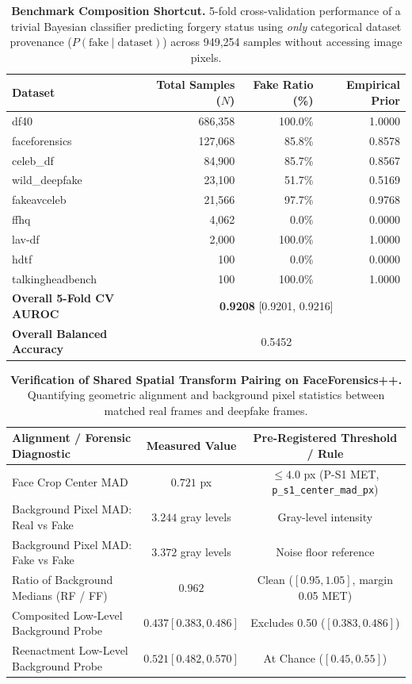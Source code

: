 \begin{table}[t]
\centering
\small
\caption{\textbf{Benchmark Composition Shortcut.} 5-fold cross-validation performance of a trivial Bayesian classifier predicting forgery status using \emph{only} categorical dataset provenance ($P(\text{fake} \mid \text{dataset})$) across 949,254 samples without accessing image pixels.}
\label{tab:dataset_id}
\begin{tabular}{lrrr}
\toprule
\textbf{Dataset} & \textbf{Total Samples ($N$)} & \textbf{Fake Ratio (\%)} & \textbf{Empirical Prior} \\
\midrule
df40 & 686,358 & 100.0\% & 1.0000 \\
faceforensics & 127,068 & 85.8\% & 0.8578 \\
celeb_df & 84,900 & 85.7\% & 0.8567 \\
wild_deepfake & 23,100 & 51.7\% & 0.5169 \\
fakeavceleb & 21,566 & 97.7\% & 0.9768 \\
ffhq & 4,062 & 0.0\% & 0.0000 \\
lav-df & 2,000 & 100.0\% & 1.0000 \\
hdtf & 100 & 0.0\% & 0.0000 \\
talkingheadbench & 100 & 100.0\% & 1.0000 \\
\midrule
\textbf{Overall 5-Fold CV AUROC} & \multicolumn{3}{c}{\textbf{0.9208} [0.9201, 0.9216]} \\
\textbf{Overall Balanced Accuracy} & \multicolumn{3}{c}{0.5452} \\
\bottomrule
\end{tabular}
\end{table}


\begin{table}[t]
\centering
\small
\caption{\textbf{Verification of Shared Spatial Transform Pairing on FaceForensics++.} Quantifying geometric alignment and background pixel statistics between matched real frames and deepfake frames.}
\label{tab:pairing_geometry}
\begin{tabular}{lcc}
\toprule
\textbf{Alignment / Forensic Diagnostic} & \textbf{Measured Value} & \textbf{Pre-Registered Threshold / Rule} \\
\midrule
Face Crop Center MAD & $0.721$ px & $\le 4.0$ px (P-S1 MET, \texttt{p\_s1\_center\_mad\_px}) \\
Background Pixel MAD: Real vs Fake & $3.244$ gray levels & Gray-level intensity \\
Background Pixel MAD: Fake vs Fake & $3.372$ gray levels & Noise floor reference \\
Ratio of Background Medians (RF / FF) & $0.962$ & Clean ($[0.95, 1.05]$, margin 0.05 MET) \\
Composited Low-Level Background Probe & $0.437 [0.383, 0.486]$ & Excludes 0.50 ($[0.383, 0.486]$) \\
Reenactment Low-Level Background Probe & $0.521 [0.482, 0.570]$ & At Chance ($[0.45, 0.55]$) \\
\bottomrule
\end{tabular}
\end{table}